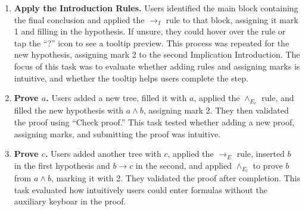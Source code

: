 \begin{enumerate}
    \item \textbf{Apply the Introduction Rules.} 
    Users identified the main block containing the final conclusion and applied the $\to_I$ rule to that block, assigning it mark 1 and filling in the hypothesis. If unsure, they could hover over the rule or tap the ``?'' icon to see a tooltip preview. This process was repeated for the new hypothesis, assigning mark 2 to the second Implication Introduction. The focus of this task was to evaluate whether adding rules and assigning marks is intuitive, and whether the tooltip helps users complete the step.  
    \begin{center}
    \end{center}

    \item \textbf{Prove $a$.} 
    Users added a new tree, filled it with $a$, applied the $\land_{E_r}$ rule, and filled the new hypothesis with $a \land b$, assigning mark 2. They then validated the proof using ``Check proof.'' This task tested whether adding a new proof, assigning marks, and submitting the proof was intuitive.  
    \begin{center}
    \end{center}

    \item \textbf{Prove $c$.} 
    Users added another tree with $c$, applied the $\to_E$ rule, inserted $b$ in the first hypothesis and $b \to c$ in the second, and applied $\land_{E_l}$ to prove $b$ from $a \land b$, marking it with 2. They validated the proof after completion.  This task evaluated how intuitively users could enter formulas without the auxiliary keyboar in the proof.
    \begin{center}
    \end{center}


\end{enumerate}
